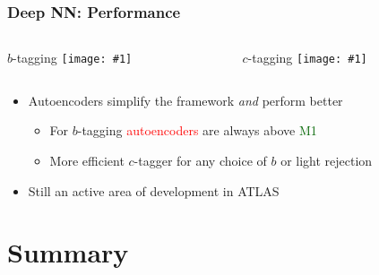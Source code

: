 \documentclass[usenames,dvipsnames]{beamer}
\newcommand{\widegraphic}[1]{\texttt{[image: \#1]}}
\begin{document}
\begin{frame}
  \frametitle{Deep NN: Performance}
  \begin{columns}
    \begin{column}{0.5\textwidth}
      \begin{center}
        $b$-tagging
       \widegraphic{%
figures/external/uRejRoc.pdf}
      \end{center}
    \end{column}
    \begin{column}{0.5\textwidth}
      \begin{center}
        $c$-tagging
      \widegraphic{figures/external/ctag-2d-gaia-vs-jfc.pdf}
      \end{center}
    \end{column}
  \end{columns}
  \begin{itemize}
  \item Autoencoders simplify the framework \emph{and} perform better
    \begin{itemize}
    \item For $b$-tagging \textcolor{red}{autoencoders} are always above \textcolor{darkgreen}{M1}
    \item More efficient $c$-tagger for any choice of $b$ or light rejection
    \end{itemize}
  \item Still an active area of development in ATLAS
  \end{itemize}
\end{frame}


\section{Summary}
\end{document}
